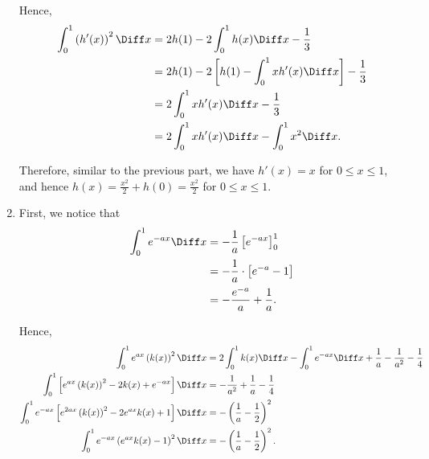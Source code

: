 \begin{enumerate}
          Hence,
          \begin{align*}
              \int_{0}^{1} \left(h'(x)\right)^2 \Diff x & = 2h(1) - 2 \int_{0}^{1} h(x) \Diff x - \frac{1}{3}                         \\
                                                        & = 2 h(1) - 2 \left[h(1) - \int_{0}^{1} x h'(x) \Diff x\right] - \frac{1}{3} \\
                                                        & = 2 \int_{0}^{1} x h'(x) \Diff x - \frac{1}{3}                              \\
                                                        & = 2 \int_{0}^{1} x h'(x) \Diff x - \int_{0}^{1} x^2 \Diff x.
          \end{align*}

          Therefore, similar to the previous part, we have \(h'(x) = x\) for \(0 \leq x \leq 1\), and hence \(h(x) = \frac{x^2}{2} + h(0) = \frac{x^2}{2}\) for \(0 \leq x \leq 1\).

    \item First, we notice that
          \begin{align*}
              \int_{0}^{1} e^{-ax} \Diff x & = - \frac{1}{a} \left[e^{-ax}\right]_{0}^{1}  \\
                                           & = - \frac{1}{a} \cdot \left[e^{-a} - 1\right] \\
                                           & = - \frac{e^{-a}}{a} + \frac{1}{a}.
          \end{align*}

          Hence,
          \begin{align*}
              \int_{0}^{1} e^{ax} \left(k(x)\right)^2 \Diff x                                           & = 2 \int_{0}^{1} k(x) \Diff x - \int_{0}^{1} e^{-ax} \Diff x + \frac{1}{a} - \frac{1}{a^2} - \frac{1}{4} \\
              \int_{0}^{1} \left[e^{ax} \left(k(x)\right)^2 - 2 k(x) + e^{-ax}\right] \Diff x           & = - \frac{1}{a^2} + \frac{1}{a} - \frac{1}{4}                                                            \\
              \int_{0}^{1} e^{-ax} \left[e^{2ax} \left(k(x)\right)^2 - 2 e^{ax} k(x) + 1\right] \Diff x & = - \left(\frac{1}{a} - \frac{1}{2}\right)^2                                                             \\
              \int_{0}^{1} e^{-ax} \left(e^{ax} k(x)- 1\right)^2 \Diff x                                & = - \left(\frac{1}{a} - \frac{1}{2}\right)^2.
          \end{align*}


\end{enumerate}
